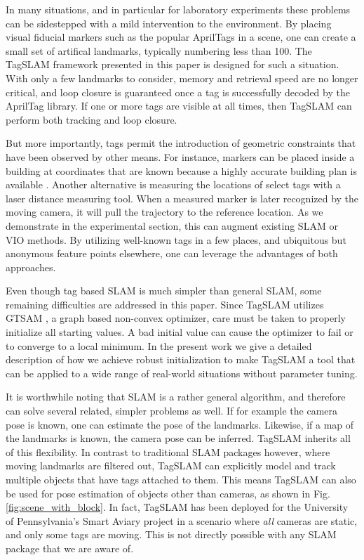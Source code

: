 In many situations, and in particular for laboratory experiments these
problems can be sidestepped with a mild intervention to the 
environment. By placing visual fiducial markers such as the
popular AprilTags \cite{wang2016} in a scene, one can create a small
set of artifical landmarks, typically numbering less than 100. The
TagSLAM framework presented in this paper is designed for such a situation.
With only a few landmarks to consider, memory and retrieval speed are
no longer critical, and loop closure is 
guaranteed once a tag is successfully decoded by the AprilTag
library. If one or more tags are visible at all times, then TagSLAM
can perform both tracking and loop closure.

But more importantly, tags permit the introduction of geometric
constraints that have been observed by other means. For instance, markers
can be placed inside a building at coordinates that are known because
a highly accurate building plan is available
\cite{pfrommer2017}. Another alternative is measuring the locations
of select tags with a laser distance measuring tool. When a measured
marker is later recognized by the moving camera, it will pull the
trajectory to the reference location. As we demonstrate in the
experimental section, this can augment existing SLAM or
VIO methods. By utilizing well-known tags in a few places, and
ubiquitous but anonymous feature points elsewhere, one can leverage
the advantages of both approaches.

Even though tag based SLAM is much simpler than general SLAM, some
remaining difficulties are addressed in this paper. Since TagSLAM
utilizes GTSAM  \cite{kaess2011}, a graph based non-convex optimizer, care must be taken
to properly initialize all starting values. A bad initial value can
cause the optimizer to fail or to converge to a local minimum. In the
present work we give a detailed description of how we achieve robust
initialization to make TagSLAM a tool that can be applied to a wide range of
real-world situations without parameter tuning.

It is worthwhile noting that SLAM is a rather general algorithm, and
therefore can solve several related, simpler problems as well. If for
example the camera pose is known, one can estimate the pose of the
landmarks. Likewise, if a map of the landmarks is known, the camera
pose can be inferred. TagSLAM inherits all of this flexibility. In
contrast to traditional SLAM packages however, where moving landmarks
are filtered out, TagSLAM can explicitly model and track multiple
objects that have tags attached to them. This means TagSLAM can also
be used for pose estimation of objects other than cameras, as shown in
Fig. \ref{fig:scene_with_block}. In fact, TagSLAM has been deployed for
the University of Pennsylvania's Smart Aviary project in a scenario
where {\em all} cameras are static, and only some tags are
moving. This is not directly possible with any SLAM package that we
are aware of.

